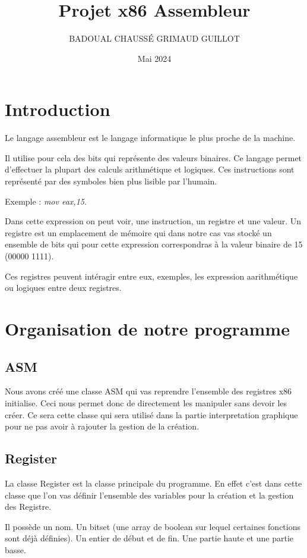 \documentclass{article}
\title{Projet x86 Assembleur}
\author{BADOUAL CHAUSSÉ GRIMAUD GUILLOT}
\date{Mai 2024}
\begin{document}
\maketitle

\section{Introduction}
Le langage assembleur est le langage informatique le plus proche de la machine.

Il utilise pour cela des bits qui représente des valeurs binaires. Ce langage permet d'effectuer la plupart des calculs arithmétique et logiques. Ces instructions sont représenté par des symboles bien plus lisible par l'humain.

Exemple : \emph{mov eax,15}.

Dans cette expression on peut voir, une instruction, un registre et une valeur. Un registre est un emplacement de mémoire qui dans notre cas vas stocké un ensemble de bits qui pour cette expression correspondras à la valeur binaire de 15 (00000 1111).

Ces registres peuvent intéragir entre eux, exemples, les expression aarithmétique ou logiques entre deux registres.

\section{Organisation de notre programme}
\subsection{ASM}
Nous avons créé une classe ASM qui vas reprendre l'ensemble des registres x86 initialise. Ceci nous permet donc de directement les manipuler sans devoir les créer. Ce sera cette classe qui sera utilisé dans la partie interpretation graphique pour ne pas avoir à rajouter la gestion de la création.


\subsection{Register}
La classe Register est la classe principale du programme. En effet c'est dans cette classe que l'on vas définir l'ensemble des variables pour la création et la gestion des Registre.

Il possède un nom.
Un bitset (une array de boolean sur lequel certaines fonctions sont déjà définies).
Un entier de début et de fin.
Une partie haute et une partie basse.
\end{document}
